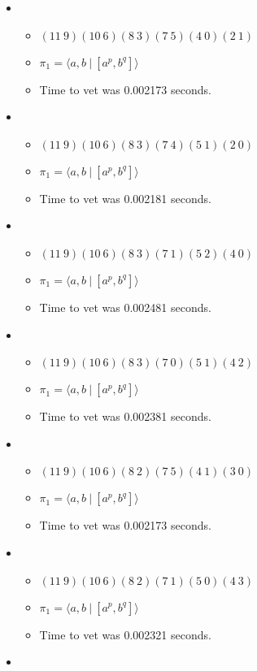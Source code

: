 \documentclass{article}
\begin{document}
\begin{itemize}
\item \begin{itemize}
      \item $(11\ 9)(10\ 6)(8\ 3)(7\ 5)(4\ 0)(2\ 1)$
      \item $\pi_1 = \langle a,b\ |\ [a^p,b^q]\rangle$
      \item Time to vet was 0.002173 seconds.
\end{itemize}
\item \begin{itemize}
      \item $(11\ 9)(10\ 6)(8\ 3)(7\ 4)(5\ 1)(2\ 0)$
      \item $\pi_1 = \langle a,b\ |\ [a^p,b^q]\rangle$
      \item Time to vet was 0.002181 seconds.
\end{itemize}
\item \begin{itemize}
      \item $(11\ 9)(10\ 6)(8\ 3)(7\ 1)(5\ 2)(4\ 0)$
      \item $\pi_1 = \langle a,b\ |\ [a^p,b^q]\rangle$
      \item Time to vet was 0.002481 seconds.
\end{itemize}
\item \begin{itemize}
      \item $(11\ 9)(10\ 6)(8\ 3)(7\ 0)(5\ 1)(4\ 2)$
      \item $\pi_1 = \langle a,b\ |\ [a^p,b^q]\rangle$
      \item Time to vet was 0.002381 seconds.
\end{itemize}
\item \begin{itemize}
      \item $(11\ 9)(10\ 6)(8\ 2)(7\ 5)(4\ 1)(3\ 0)$
      \item $\pi_1 = \langle a,b\ |\ [a^p,b^q]\rangle$
      \item Time to vet was 0.002173 seconds.
\end{itemize}
\item \begin{itemize}
      \item $(11\ 9)(10\ 6)(8\ 2)(7\ 1)(5\ 0)(4\ 3)$
      \item $\pi_1 = \langle a,b\ |\ [a^p,b^q]\rangle$
      \item Time to vet was 0.002321 seconds.
\end{itemize}
\item \begin{itemize}

\end{itemize}
\end{itemize}
\end{document}
